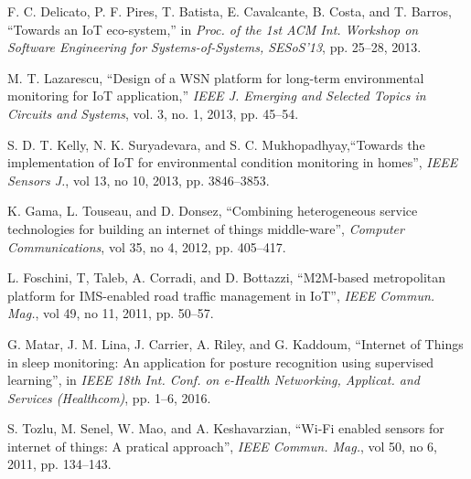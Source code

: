\documentclass[conference]{IEEEtran}
\begin{document}
%
%
%
\begin{thebibliography}{1}


F. C. Delicato, P. F. Pires,  T. Batista, E. Cavalcante, B. Costa, and  T. Barros, ``Towards an IoT eco-system,'' in  \textit{Proc. of the 1st ACM Int. Workshop on Software Engineering for Systems-of-Systems, SESoS'13}, pp. 25--28, 2013.


M. T. Lazarescu, ``Design of a WSN platform for long-term environmental monitoring for IoT application,'' \textit{IEEE J. Emerging and Selected Topics in Circuits and Systems}, vol. 3, no. 1, 2013, pp. 45--54.



S. D. T. Kelly, N. K. Suryadevara, and S. C. Mukhopadhyay,``Towards the implementation of IoT for environmental condition monitoring in homes'', \textit{IEEE Sensors J.}, vol 13, no 10, 2013, pp. 3846--3853.

K. Gama, L. Touseau, and D. Donsez, ``Combining heterogeneous service technologies for building an internet of things middle-ware'', \textit{Computer Communications}, vol 35, no 4, 2012, pp. 405--417.


L. Foschini, T, Taleb, A. Corradi, and D. Bottazzi, ``M2M-based metropolitan platform for IMS-enabled road traffic management in IoT'',\textit{ IEEE Commun. Mag.}, vol 49, no 11, 2011, pp. 50--57.


G. Matar, J. M. Lina, J. Carrier, A. Riley, and G. Kaddoum, ``Internet of Things in sleep monitoring: An application for posture recognition using supervised learning'', in \textit{IEEE 18th Int. Conf. on e-Health Networking, Applicat. and Services (Healthcom)}, pp. 1--6, 2016.




S. Tozlu, M. Senel, W. Mao, and A. Keshavarzian, ``Wi-Fi enabled sensors for internet of things: A pratical approach'', \textit{IEEE Commun. Mag.}, vol 50, no 6, 2011, pp. 134--143.


\end{thebibliography}
\end{document}
